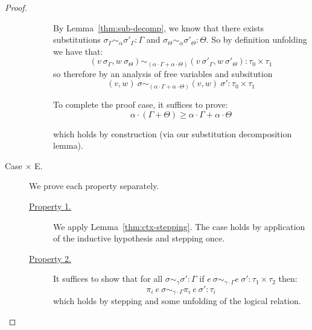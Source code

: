 \begin{proof}
\begin{description}
\begin{description}
          By Lemma~\ref{thm:sub-decomp}, we know that there exists substitutions
          $\sigma_{\Gamma} \sim_{\alpha} \sigma'_{\Gamma} : \Gamma$
          and
          $\sigma_{\Theta} \sim_{\alpha} \sigma'_{\Theta} : \Theta$.
          So by definition unfolding we have that:
          $$
          (v~\sigma_{\Gamma}, w~\sigma_{\Theta}) 
            \sim_{(\alpha \cdot \Gamma + \alpha \cdot \Theta)} 
          (v~\sigma'_{\Gamma}, w~\sigma'_{\Theta})
          : \tau_0 \times \tau_1
          $$
          so therefore by an analysis of free variables and subsitution
          $$
          (v, w)~\sigma 
            \sim_{(\alpha \cdot \Gamma + \alpha \cdot \Theta)} 
          (v, w)~\sigma'
          : \tau_0 \times \tau_1
          $$

          To complete the proof case, it suffices to prove:
          $$\alpha \cdot (\Gamma + \Theta) \geq \alpha \cdot \Gamma + \alpha \cdot \Theta$$

          which holds by construction (via our substitution decomposition lemma).
      \end{description}

    \item[Case $\times$ E.] 
      We prove each property separately.
      \begin{description}
        \item[\underline{Property 1.}]
          We apply Lemma~\ref{thm:ctx-stepping}. The case holds by application
          of the inductive hypothesis and stepping once.
        \item[\underline{Property 2.}]
          It suffices to show that for all $\sigma \sim_{\gamma} \sigma' : \Gamma$
          if $e~\sigma \sim_{\gamma \cdot \Gamma} e~\sigma' : \tau_1 \times \tau_2$
          then:
          $$
          \pi_i~e~\sigma \sim_{\gamma \cdot \Gamma} \pi_i~e~\sigma' : \tau_i
          $$
          which holds by stepping and some unfolding of the logical relation.
      \end{description}


\end{description}
\end{proof}
